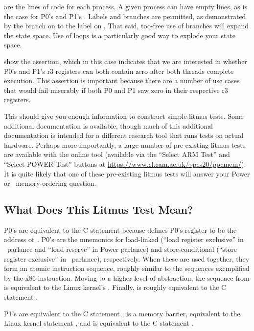 \begin{fcvref}
 are the lines of code for each process.
A given process can have empty lines, as is the case for P0's
 and P1's .
Labels and branches are permitted, as demonstrated by the branch
on  to the label on .
That said, too-free use of branches will expand the state space.
Use of loops is a particularly good way to explode your state space.

 show the assertion, which in this case
indicates that we are interested in whether P0's and P1's r3 registers
can both contain zero after both threads complete execution.
This assertion is important because there are a number of use cases
that would fail miserably if both P0 and P1 saw zero in their
respective r3 registers.

This should give you enough information to construct simple litmus tests.
Some additional documentation is available, though much of this
additional documentation is intended for a different research tool that
runs tests on actual hardware.
Perhaps more importantly, a large number of pre-existing litmus tests
are available with the online tool (available via the ``Select ARM Test''
and ``Select POWER Test'' buttons at
\url{https://www.cl.cam.ac.uk/~pes20/ppcmem/}).
It is quite likely that one of these pre-existing litmus tests will
answer your Power or \ARM\ memory-ordering question.

\subsection{What Does This Litmus Test Mean?}
\label{sec:formal:What Does This Litmus Test Mean?}

P0's  are equivalent to the C statement 
because  defines P0's register  to be the address
of~.
P0's  are the mnemonics for load-linked
(``load register exclusive'' in \ARM\ parlance and ``load reserve''
in Power parlance) and store-conditional (``store register exclusive''
in \ARM\ parlance), respectively.
When these are used together, they form an atomic instruction sequence,
roughly similar to the  sequences exemplified by the
x86  instruction.
Moving to a higher level of abstraction, the sequence from
is equivalent to the Linux kernel's .
Finally,  is roughly equivalent to the C statement .

P1's  are equivalent to the C statement ,
is a memory barrier, equivalent to the Linux kernel statement ,
and  is equivalent to the C statement .
\end{fcvref}

